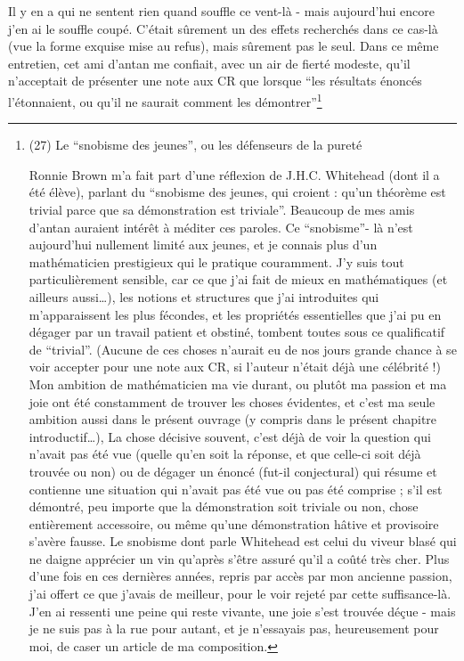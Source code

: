 Il y en a qui ne sentent rien quand souffle ce vent-là - mais aujourd'hui encore j'en ai le souffle coupé. C'était sûrement un des effets recherchés dans ce cas-là (vue la forme exquise mise au refus), mais sûrement pas le seul. Dans ce même entretien, cet ami d'antan me confiait, avec un air de fierté modeste, qu'il n'acceptait de présenter une note aux CR que lorsque ``les résultats énoncés l'étonnaient, ou qu'il ne saurait comment les démontrer''\footnote{(27) Le ``snobisme des jeunes'', ou les défenseurs de la pureté

Ronnie Brown m'a fait part d'une réflexion de J.H.C. Whitehead (dont il a été élève), parlant du ``snobisme des jeunes, qui croient : qu'un théorème est trivial parce que sa démonstration est triviale''. Beaucoup de mes amis d'antan auraient intérêt à méditer ces paroles. Ce ``snobisme''- là n'est aujourd'hui nullement limité aux jeunes, et je connais plus d'un mathématicien prestigieux qui le pratique couramment. J'y suis tout particulièrement sensible, car ce que j'ai fait de mieux en mathématiques (et ailleurs aussi\ldots), les notions et structures que j'ai introduites qui m'apparaissent les plus fécondes, et les propriétés essentielles que j'ai pu en dégager par un travail patient et obstiné, tombent toutes sous ce qualificatif de ``trivial''. (Aucune de ces choses n'aurait eu de nos jours grande chance à se voir accepter pour une note aux CR, si l'auteur n'était déjà une célébrité !) Mon ambition de mathématicien ma vie durant, ou plutôt ma passion et ma joie ont été constamment de trouver les choses évidentes, et c'est ma seule ambition aussi dans le présent ouvrage (y compris dans le présent chapitre introductif\ldots), La chose décisive souvent, c'est déjà de voir la question qui n'avait pas été vue (quelle qu'en soit la réponse, et que celle-ci soit déjà trouvée ou non) ou de dégager un énoncé (fut-il conjectural) qui résume et contienne une situation qui n'avait pas été vue ou pas été comprise ; s'il est démontré, peu importe que la démonstration soit triviale ou non, chose entièrement accessoire, ou même qu'une démonstration hâtive et provisoire s'avère fausse. Le snobisme dont parle Whitehead est celui du viveur blasé qui ne daigne apprécier un vin qu'après s'être assuré qu'il a coûté très cher. Plus d'une fois en ces dernières années, repris par accès par mon ancienne passion, j'ai offert ce que j'avais de meilleur, pour le voir rejeté par cette suffisance-là. J'en ai ressenti une peine qui reste vivante, une joie s'est trouvée déçue - mais je ne suis pas à la rue pour autant, et je n'essayais pas, heureusement pour moi, de caser un article de ma composition.

}
